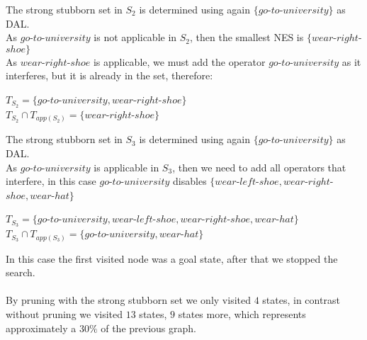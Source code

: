 \documentclass[11pt,a4paper]{article}
\begin{document}
The strong stubborn set in $S_2$ is determined using again $\{go$-$to$-$university\}$ as DAL.\\
As $go$-$to$-$university$ is not applicable in $S_2$, then the smallest NES is $\{wear$-$right$-$shoe\}$\\
As $wear$-$right$-$shoe$ is applicable, we must add the operator $go$-$to$-$university$ as it interferes,  but it is already in the set, therefore:
\begin{center}
	$T_{S_2} = \{go$-$to$-$university, wear$-$right$-$shoe\}$\\
	$T_{S_2} \cap T_{app(S_2)} = \{wear$-$right$-$shoe\}$
\end{center}

The strong stubborn set in $S_3$ is determined using again $\{go$-$to$-$university\}$ as DAL.\\
As $go$-$to$-$university$ is applicable in $S_3$, then we need to add all operators that interfere, in this case $go$-$to$-$university$ disables $\{wear$-$left$-$shoe, wear$-$right$-$shoe, wear$-$hat\}$
\begin{center}
	$T_{S_3} = \{go$-$to$-$university, wear$-$left$-$shoe, wear$-$right$-$shoe, wear$-$hat\}$\\
	$T_{S_3} \cap T_{app(S_3)} = \{go$-$to$-$university, wear$-$hat\}$
\end{center}
In this case the first visited node was a goal state, after that we stopped the search.\\\\
By pruning with the strong stubborn set we only visited $4$ states, in contrast without pruning we visited $13$ states, $9$ states more, which represents approximately a $30\%$ of the previous graph.
\end{document}
